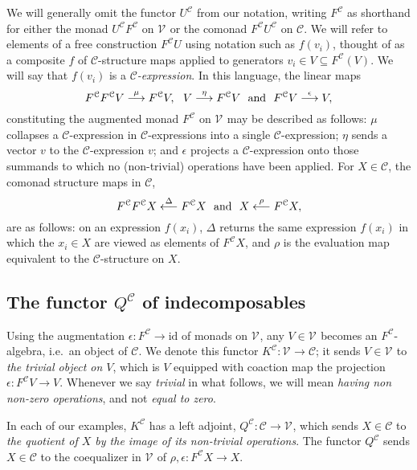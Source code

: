 \documentclass[11pt]{amsart} \renewcommand{\baselinestretch}{1.2}
\theoremstyle{plain}
\theoremstyle{definition}
\renewcommand{\to}{\longrightarrow}
\newcommand{\from}{\longleftarrow}
\newcommand{\calV}{\mathcal{V}}
\newcommand{\calc}{\mathcal{C}}
\newcommand{\vect}[2]{\calV^{#1}_{#2}}
\newcommand{\Id}{\mathrm{id}}
\begin{document}
\begin{Conventions and notation}
We will generally omit the functor $U^{\calc}$ from our notation, writing $F^{\calc}$ as shorthand for either the monad $U^{\calc}F^{\calc}$ on $\vect{}{}$ or the comonad $F^{\calc}U^{\calc}$ on $\calc$. We will refer to elements of a free construction $F^\calc U$ using notation such as $f(v_i)$, thought of as a composite $f$ of $\calc$-structure maps applied to generators $v_i\in V\subseteq F^\calc(V)$. We will say that $f(v_i)$ is a \emph{$\calc$-expression}. In this language, the linear maps %
\[F^\calc F^\calc V\overset{\mu}{\to} F^\calc V,\ \ V\overset{\eta}{\to}F^\calc V\ \ \textup{and}\ \ F^\calc V\overset{\epsilon}{\to}V, \]
constituting the augmented monad $F^\calc $ on $\vect{}{}$ may be described as follows: $\mu$ collapses a $\calc$-expression  in $\calc$-expressions into a single $\calc$-expression; $\eta$ sends a vector $v$ to the $\calc$-expression $v$; and $\epsilon$ projects a $\calc$-expression onto those summands to which no (non-trivial) operations have been applied.
For $X\in \calc$, the comonad structure maps in $\calc$,
\[F^\calc F^\calc X\overset{\Delta}{\from} F^\calc X\ \ \textup{and}\ \ X\overset{\rho}{\from}F^\calc X,\]
are as follows: on an expression $f(x_i)$, $\Delta$ returns the same expression $f(x_i)$ in which the $x_i\in X$ are viewed as elements of $F^\calc X$, and $\rho$ is the evaluation map equivalent to the $\calc$-structure on $X$.

\subsection{The functor $Q^\calc$ of indecomposables}
Using the augmentation $\epsilon:F^\calc\to\Id$ of monads on $\vect{}{}$, any $V\in\vect{}{}$ becomes an $F^\calc $-algebra, i.e.\ an object of $\calc$. We denote this functor $K^\calc:\vect{}{}\to \calc$; it sends $V\in\vect{}{}$ to \emph{the trivial object on $V$}, which is $V$ equipped with coaction map the projection $\epsilon:F^{\calc}V\to V$. Whenever we say \emph{trivial} in what follows, we will mean \emph{having non non-zero operations}, and not \emph{equal to zero}.

In each of our examples,  $K^{\calc}$ has a left adjoint, $Q^{\calc}:\calc\to\vect{}{}$, which sends $X\in\calc$ to \emph{the quotient of $X$ by the image of its non-trivial operations}. %
The functor $Q^{\calc}$ sends $X\in \calc$ to the coequalizer in $\vect{}{}$ of $\rho,\epsilon:F^\calc X\to X$.


\end{Conventions and notation}
\end{document}
